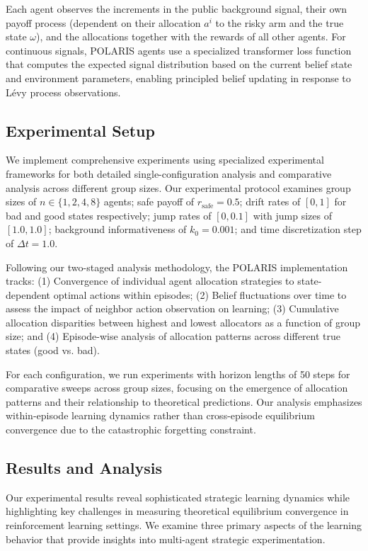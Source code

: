 Each agent observes the increments in the public background signal, their own payoff process (dependent on their allocation $a^i$ to the risky arm and the true state $\omega$), and the allocations together with the rewards of all other agents. For continuous signals, POLARIS agents use a specialized transformer loss function that computes the expected signal distribution based on the current belief state and environment parameters, enabling principled belief updating in response to Lévy process observations.

\subsection{Experimental Setup}

We implement comprehensive experiments using specialized experimental frameworks for both detailed single-configuration analysis and comparative analysis across different group sizes. Our experimental protocol examines group sizes of $n \in \{1, 2, 4, 8\}$ agents; safe payoff of $r_{\text{safe}} = 0.5$; drift rates of $[0, 1]$ for bad and good states respectively; jump rates of $[0, 0.1]$ with jump sizes of $[1.0, 1.0]$; background informativeness of $k_0 = 0.001$; and time discretization step of $\Delta t = 1.0$.

Following our two-staged analysis methodology, the POLARIS implementation tracks: (1) Convergence of individual agent allocation strategies to state-dependent optimal actions within episodes; (2) Belief fluctuations over time to assess the impact of neighbor action observation on learning; (3) Cumulative allocation disparities between highest and lowest allocators as a function of group size; and (4) Episode-wise analysis of allocation patterns across different true states (good vs. bad).

For each configuration, we run experiments with horizon lengths of 50 steps for comparative sweeps across group sizes, focusing on the emergence of allocation patterns and their relationship to theoretical predictions. Our analysis emphasizes within-episode learning dynamics rather than cross-episode equilibrium convergence due to the catastrophic forgetting constraint.

\subsection{Results and Analysis}

Our experimental results reveal sophisticated strategic learning dynamics while highlighting key challenges in measuring theoretical equilibrium convergence in reinforcement learning settings. We examine three primary aspects of the learning behavior that provide insights into multi-agent strategic experimentation.

